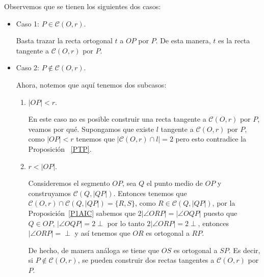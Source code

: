 Observemos que se tienen los siguientes dos casos:
\begin{itemize}
\item Caso 1: $P\in\mathcal{C}(O,r)$. 

Basta trazar la recta ortogonal $t$ a $OP$ por $P$. De esta manera, $t$ es la recta tangente a $\mathcal{C}(O,r)$ por $P$.

\item Caso 2: $P\notin\mathcal{C}(O,r)$.

Ahora, notemos que aquí tenemos dos subcasos:
\begin{enumerate}
\item $|OP|<r$.

En este caso no es posible construir una recta tangente a $\mathcal{C}(O,r)$ por $P$, veamos por qué. Supongamos que existe $l$ tangente a $\mathcal{C}(O,r)$ por $P$, como  $|OP|<r$ tenemos que $|\mathcal{C}(O,r)\cap l|=2$ pero esto contradice la Proposición ~\ref{PTP}.

\item $r<|OP|$.

Consideremos el segmento $OP$, sea $Q$ el punto medio de $OP$ y construyamos $\mathcal{C}(Q,|QP|)$. Entonces tenemos que $\mathcal{C}(O,r)\cap\mathcal{C}(Q,|QP|)=\{R,S\}$, como $R\in\mathcal{C}(Q,|QP|)$, por la Proposición~\ref{P1AIC} sabemos que $2|\angle ORP|=|\angle OQP|$ puesto que $Q\in OP$, $|\angle OQP|=2\perp$ por lo tanto $2|\angle ORP|=2\perp$, entonces $|\angle ORP|=\perp$ y así tenemos que $OR$ es ortogonal a $RP$.

De hecho, de manera análoga se tiene que $OS$ es ortogonal a $SP$. Es decir, si $P\notin\mathcal{C}(O,r)$, se pueden construir dos rectas tangentes a $\mathcal{C}(O,r)$ por $P$.  
\end{enumerate}
\end{itemize}

